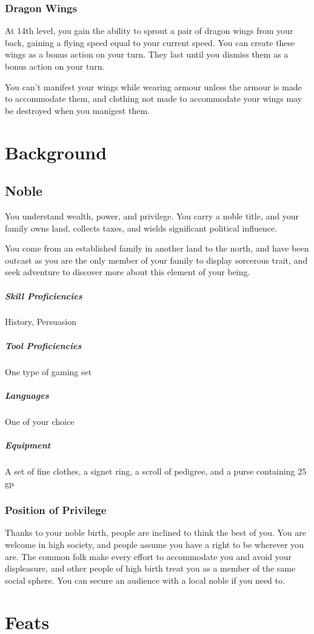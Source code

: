 \documentclass[a4paper,openany,twocolumn]{book}
\begin{document}
\subsubsection*{Dragon Wings}
At 14th level, you gain the ability to sprout a pair of dragon wings from your back, gaining a flying speed equal to your current speed. You can create these wings as a bonus action on your turn. They last until you dismiss them as a bonus action on your turn.

You can't manifest your wings while wearing armour unless the armour is made to accommodate them, and clothing not made to accommodate your wings may be destroyed when you manigest them.

\section*{Background}
\subsection*{Noble}
You understand wealth, power, and privilege. You carry a noble title, and your family owns land, collects taxes, and wields significant political influence.

You come from an established family in another land to the north, and have been outcast as you are the only member of your family to display sorcerous trait, and seek adventure to discover more about this element of your being.

\subparagraph*{Skill Proficiencies} History, Persuasion
\subparagraph*{Tool Proficiencies} One type of gaming set
\subparagraph*{Languages} One of your choice
\subparagraph*{Equipment} A set of fine clothes, a signet ring, a scroll of pedigree, and a purse containing 25 gp

\subsubsection*{Position of Privilege}
Thanks to your noble birth, people are inclined to think the best of you. You are welcome in high society, and people assume you have a right to be wherever you are. The common folk make every effort to accommodate you and avoid your displeasure, and other people of high birth treat you as a member of the same social sphere. You can secure an audience with a local noble if you need to.


\section*{Feats}
\end{document}

